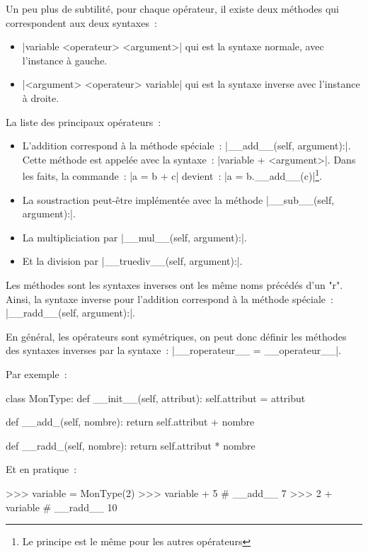 		Un peu plus de subtilité, pour chaque opérateur, il existe deux méthodes qui correspondent aux deux syntaxes~:
		\begin{itemize}
			\item \python|variable <operateur> <argument>| qui est la syntaxe normale, avec l'instance à gauche.
			\item \python|<argument> <operateur> variable| qui est la syntaxe inverse avec l'instance à droite.
		\end{itemize}
		
		La liste des principaux opérateurs~:
		\begin{itemize}
			\item L'addition correspond à la méthode spéciale~: \python|__add__(self, argument):|. Cette méthode est appelée avec la syntaxe~: \python|variable + <argument>|. Dans les faits, la commande~: \python|a = b + c| devient~: \python|a = b.__add__(c)|\footnote{Le principe est le même pour les autres opérateurs}.
			\item La soustraction peut-être implémentée avec la méthode \python|__sub__(self, argument):|.
			\item La multipliciation par \python|__mul__(self, argument):|.
			\item Et la division par \python|__truediv__(self, argument):|.
		\end{itemize}
		
		Les méthodes sont les syntaxes inverses ont les même noms précédés d'un "r". Ainsi, la syntaxe inverse pour l'addition correspond à la méthode spéciale~: \python|__radd__(self, argument):|.
		
		En général, les opérateurs sont symétriques, on peut donc définir les méthodes des syntaxes inverses par la syntaxe~: \python|__roperateur__ = __operateur__|.
		
		Par exemple~:
		\begin{pythoncode}
			class MonType:
				def __init__(self, attribut):
					self.attribut = attribut
				
				def __add_(self, nombre):
					return self.attribut + nombre
				
				def __radd_(self, nombre):
					return self.attribut * nombre
		\end{pythoncode}
		Et en pratique~:
		\begin{pythoncode}
			>>> variable = MonType(2)
			>>> variable + 5 # __add__
			7
			>>> 2 + variable # __radd__
			10
		\end{pythoncode}
		
